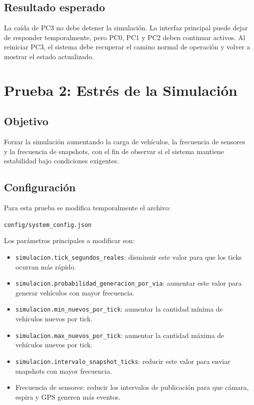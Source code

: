 \documentclass[12pt, a4paper]{article}
\begin{document}
\subsection{Resultado esperado}

La caída de PC3 no debe detener la simulación. La interfaz principal puede dejar de responder temporalmente, pero PC0, PC1 y PC2 deben continuar activos. Al reiniciar PC3, el sistema debe recuperar el camino normal de operación y volver a mostrar el estado actualizado.

\section{Prueba 2: Estrés de la Simulación}

\subsection{Objetivo}

Forzar la simulación aumentando la carga de vehículos, la frecuencia de sensores y la frecuencia de snapshots, con el fin de observar si el sistema mantiene estabilidad bajo condiciones exigentes.

\subsection{Configuración}

Para esta prueba se modifica temporalmente el archivo:

\begin{center}
    \texttt{config/system\_config.json}
\end{center}

Los parámetros principales a modificar son:

\begin{itemize}
    \item \texttt{simulacion.tick\_segundos\_reales}: disminuir este valor para que los ticks ocurran más rápido.
    \item \texttt{simulacion.probabilidad\_generacion\_por\_via}: aumentar este valor para generar vehículos con mayor frecuencia.
    \item \texttt{simulacion.min\_nuevos\_por\_tick}: aumentar la cantidad mínima de vehículos nuevos por tick.
    \item \texttt{simulacion.max\_nuevos\_por\_tick}: aumentar la cantidad máxima de vehículos nuevos por tick.
    \item \texttt{simulacion.intervalo\_snapshot\_ticks}: reducir este valor para enviar snapshots con mayor frecuencia.
    \item Frecuencia de sensores: reducir los intervalos de publicación para que cámara, espira y GPS generen más eventos.
\end{itemize}
\end{document}
